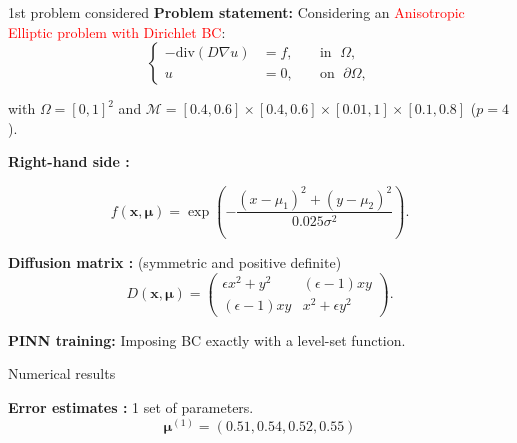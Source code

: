 \begin{frame}{1st problem considered} 
	\textbf{Problem statement:} Considering an \textcolor{red}{Anisotropic Elliptic problem with Dirichlet BC}:
	\vspace{-5pt}
	\begin{equation*}
		\left\{
		\begin{aligned}
			-\text{div}(D\nabla u) & = f, \; &  & \text{in } \; \Omega, \\
			u         & =0, \;  &  & \text{on } \; \partial\Omega,
		\end{aligned}
		\right.
	\end{equation*}

	with $\Omega=[0,1]^2$ and $\mathcal{M}=[0.4, 0.6]\times [0.4, 0.6]\times [0.01,1]\times [0.1,0.8]$ ($p=4$).
	
	\vspace{8pt}
	\textbf{Right-hand side :}

	\vspace{-5pt}
	\begin{equation*}
		f(\bm{x},\bm{\mu})=\exp\left(-\frac{(x-\mu_1)^2+(y-\mu_2)^2}{0.025\sigma^2}\right).
	\end{equation*}
	
	\textbf{Diffusion matrix :} (symmetric and positive definite)
	\begin{equation*}
		D(\bm{x},\bm{\mu})=\begin{pmatrix}
			\epsilon x^2+y^2 & (\epsilon-1)xy \\
			(\epsilon-1)xy & x^2+\epsilon y^2
		\end{pmatrix}.
	\end{equation*}

	\vspace{2pt}
	\small
	\textbf{PINN training:} Imposing BC exactly with a level-set function.
\end{frame}

\begin{frame}{Numerical results}
	\hspace{-5pt}\begin{minipage}[t]{0.46\linewidth}
		\textbf{Error estimates :} 1 set of parameters.
		$$\bm{\mu}^{(1)}=(0.51,0.54,0.52,0.55)$$
		\vspace{-35pt}
		\begin{figure}[H]
		\end{figure}
	\end{minipage} \qquad \small
	\begin{minipage}[t]{0.48\linewidth}
	\end{minipage}
\end{frame}

